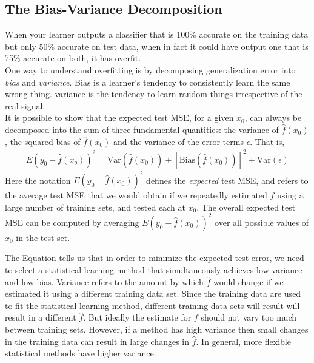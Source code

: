 \documentclass[11pt,a4paper]{report}
\begin{document}
\subsection*{The Bias-Variance Decomposition}

\noindent When your learner outputs a classifier that is 100\%
accurate on the training data but only 50\% accurate on test data,
when in fact it could have output one that is 75\% accurate on both,
it has overfit.\\ 

\noindent One way to understand overfitting is by decomposing
generalization error into \emph{bias} and \emph{variance}. Bias is a
learner's tendency to consistently learn the same wrong thing.
variance is the tendency to learn random things irrespective of the
real signal.\\

\noindent It is possible to show that the expected test MSE, for a
given $x_0$, can always be decomposed into the sum of three
fundamental quantities: the variance of $\hat{f}(x_0)$, the squared bias
of $\hat{f}(x_0)$ and the variance of the error terms $\epsilon$. That
is,
\begin{eqnarray*}
  E(y_0 - \hat{f}(x_o))^{2} = \mathrm{Var}(\hat{f}(x_0)) +
  [\mathrm{Bias}(\hat{f}(x_0))]^{2} + \mathrm{Var}(\epsilon)
\end{eqnarray*}
\noindent Here the notation $E(y_0 - \hat{f}(x_0))^{2}$ defines the
\emph{expected} test MSE, and refers to the average test MSE that we
would obtain if we repeatedly estimated $f$ using a large number of
training sets, and tested each at $x_0$. The overall expected test MSE
can be computed by averaging $E(y_0 - \hat{f}(x_0))^{2}$ over all
possible values of $x_0$ in the test set.

\noindent The Equation tells us that in order to minimize the expected
test error, we need to select a statistical learning method that
simultaneously achieves low variance and low bias. Variance refers to
the amount by which $\hat{f}$ would change if we estimated it using a
different training data set. Since the training data are used to fit
the statistical learning method, different training data sets will
result will result in a different $\hat{f}$. But ideally the estimate
for $f$ should not vary too much between training sets. However, if a
method has high variance then small changes in the training data can
result in large changes in $\hat{f}$. In general, more flexible
statistical methods have higher variance.
\end{document}

